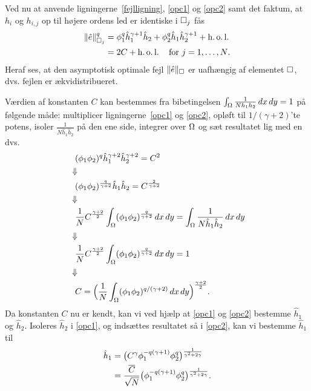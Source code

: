 Ved nu at anvende ligningerne~\eqref{fejlligning}, \eqref{opc1} og
\eqref{opc2} samt det faktum, at $h_i$ og $h_{i,j}$ op til højere
ordens led er identiske i
$\Box_j$ fås 
\begin{align} \label{error-eq-dis}
  \|\hat{e}\|_{\Box_j}^q &= \phi_1^q \hat{h}_1^{\gamma +1} \hat{h}_2
    + \phi_2^q \hat{h}_1 \hat{h}_2^{\gamma +1} + \operatorname{h.o.l.} \\
  &= 2C + \operatorname{h.o.l.} \quad \text{for $j=1,\ldots,N$.} \notag
\end{align}
Heraf ses, at den asymptotisk optimale fejl $\|\hat{e}\|_\Box$ er
uafhængig af elementet $\Box$, dvs. fejlen er ækvidistribueret. 

Værdien af konstanten $C$ kan bestemmes fra bibetingelsen $\int_{\Omega}
\frac{1}{Nh_1h_2}\, dx\, dy=1$ på følgende måde: multiplicer
ligningerne~\eqref{opc1} og \eqref{opc2}, opløft til $1/(\gamma +2)$'te
potens, isoler $\frac{1}{N\hat{h}_1 \hat{h}_2}$ på den ene side, integrer over
$\Omega$ og sæt resultatet lig med en dvs.
\begin{align}
  &\phantom{\Downarrow} (\phi_1 \phi_2)^q \hat{h}_1^{\gamma +2} 
    \hat{h}_2^{\gamma +2} = C^2 \notag \\    
  &\Downarrow \notag \\
  &\phantom{\Downarrow}  (\phi_1 \phi_2)^{\frac{q}{\gamma +2}}
    \hat{h}_1 \hat{h}_2 = C^{\frac{2}{\gamma +2}} \notag \\   
  &\Downarrow \notag \\
  &\phantom{\Downarrow}  \frac{1}{N} C^{\frac{\gamma +2}{2}} \int_{\Omega}
    (\phi_1 \phi_2)^{\frac{q}{\gamma +2}}\, dx\, dy = \int_{\Omega}
    \frac{1}{N\hat{h}_1 \hat{h}_2}\, dx\, dy  \notag \\   
  &\Downarrow \notag \\
  &\phantom{\Downarrow}  \frac{1}{N} C^{\frac{\gamma +2}{2}} \int_{\Omega}
    (\phi_1 \phi_2)^{\frac{q}{\gamma +2}}\, dx\, dy = 1 \notag \\
  &\Downarrow \notag \\
  &\phantom{\Downarrow} C = \Bigl( \frac{1}{N}\int_{\Omega} (\phi_1\phi_2)^{q/(\gamma+2)} 
    \, dx\, dy \Bigr)^{\frac{\gamma +2}{2}}. \notag     
\end{align}
Da konstanten $C$ nu er kendt, kan vi ved hjælp at \eqref{opc1} og
\eqref{opc2} bestemme $\hat{h}_1$ og $\hat{h}_2$. Isoleres $\hat{h}_2$
i \eqref{opc1}, og indsættes resultatet så i \eqref{opc2}, kan vi
bestemme $\hat{h}_1$ til
\begin{align} \label{opt-h1}
  \hat{h}_1 &= \bigl( C^\gamma \phi_1^{-q(\gamma +1)} \phi_2^q 
    \bigr)^{\frac{1}{\gamma^2 +2\gamma}} \\
  &= \frac{\overline{C}}{\sqrt{N}} \bigl( \phi_1^{-q(\gamma +1)} \phi_2^q 
    \bigr)^{\frac{1}{\gamma^2 +2\gamma}}. \notag
\end{align}

